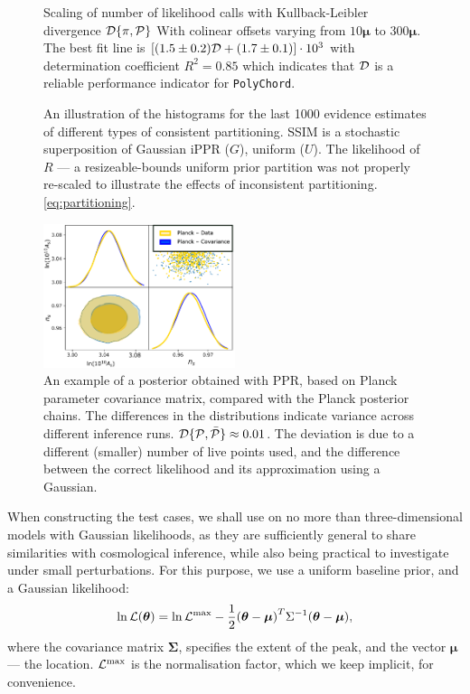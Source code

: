 \documentclass[usenatbib]{mnras}
\begin{document}
\begin{figure}
  
  \caption{Scaling of number of likelihood calls with Kullback-Leibler
    divergence \({\cal D}\{ \pi, {\cal P}\}\) With colinear offsets
    varying from $10\bm{\mu}$ to $300\bm{\mu}$. The best fit line is
    \(\left[(1.5 \pm 0.2) {\cal D} + (1.7 \pm 0.1)\right]\cdot 10^3 \)
    with determination coefficient \(R^{2} = 0.85\) which indicates
    that \({\cal D}\) is a reliable performance indicator for
    \texttt{PolyChord}.\label{fig:kl-scaling}}
\end{figure}


\begin{figure}

\caption{An illustration of the histograms for the last 1000 evidence
  estimates of different types of consistent partitioning. SSIM is a
  stochastic superposition of Gaussian iPPR (\(G\)), uniform
  (\(U\)). The likelihood of \(R\) --- a resizeable-bounds uniform
  prior partition was not properly re-scaled to illustrate the effects
  of inconsistent partitioning.
  \cref{eq:partitioning}. \label{fig:hist}}
\end{figure}




\begin{figure}
  \includegraphics[width=0.5\textwidth]{./illustrations/triangle-fit.pdf}
  \caption{An example of a posterior obtained with PPR, based on
    Planck parameter covariance matrix, compared with the Planck
    posterior chains. The differences in the distributions indicate
    variance across different inference runs.
    ${\cal D}\{ {\cal P}, \bar{\cal P}\} \approx 0.01$. The deviation
    is due to a different (smaller) number of live points used, and
    the difference between the correct likelihood and its
    approximation using a Gaussian. \label{fig:overlay-posteriors}}
\end{figure}


When constructing the test cases, we shall use on no more than
three-dimensional models with Gaussian likelihoods, as they are
sufficiently general to share similarities with cosmological
inference, while also being practical to investigate under small
perturbations.  For this purpose, we use a uniform baseline prior, and
a Gaussian likelihood:
\begin{equation}
  \ln {\cal L}(\bm{\theta}) = \ln {\cal L}^\text{max}- \dfrac{1}{2}{(\bm{\theta} - \bm{\mu})}^{T}\Sigma^{-1}(\bm{\theta}-\bm{\mu}),
\end{equation}
where the covariance matrix \(\bm{\Sigma}\), specifies the extent of
the peak, and the vector \(\bm{\mu}\) --- the location.
\({\cal L}^\text{max}\) is the normalisation factor, which we keep
implicit, for convenience.
\end{document}
